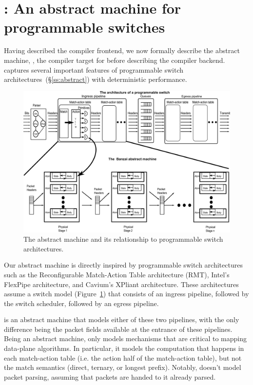 \section{\absmachine: An abstract machine for programmable switches}
\label{s:absmachine}

Having described the compiler frontend, we now formally describe the abstract
machine, \textit{\absmachine}, the compiler target for \pktlanguage before
describing the compiler backend.  \absmachine captures several important
features of programmable switch architectures~(\S\ref{ss:abstract}) with
deterministic performance.

\begin{figure}[!t]
  \includegraphics[width=\textwidth]{banzai.pdf}
  \caption{The \absmachine abstract machine and its relationship to programmable switch architectures.}
  \label{fig:switch}
\end{figure}
Our abstract machine is directly inspired by programmable switch architectures
such as the Reconfigurable Match-Action Table architecture (RMT), Intel's
FlexPipe architecture, and Cavium's XPliant architecture. These architectures
assume a switch model (Figure~\ref{fig:switch}) that consists of an ingress
pipeline, followed by the switch scheduler, followed by an egress pipeline.

\absmachine is an abstract machine that models either of these two pipelines,
with the only difference being the packet fields available at the entrance of
these pipelines. Being an abstract machine, \absmachine only models mechanisms
that are critical to mapping data-plane algorithms. In particular, it models
the computation that happens in each match-action table (i.e. the action half
of the match-action table), but not the match semantics (direct, ternary, or
longest prefix). Notably, \absmachine doesn't model packet parsing, assuming
that packets are handed to it already parsed.

